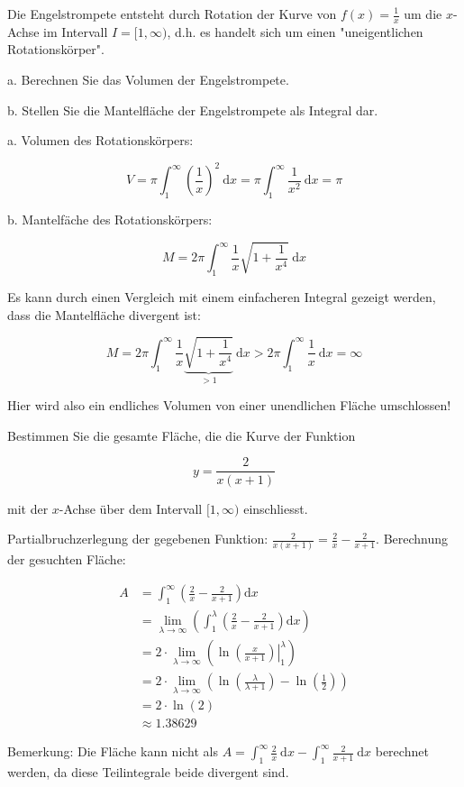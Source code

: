 \begin{example}
    Die Engelstrompete entsteht durch Rotation der Kurve von $f(x)=\frac{1}{x}$ um die $x$-Achse im Intervall $I=[1, \infty)$, d.h. es handelt sich um einen "uneigentlichen Rotationskörper".

a. Berechnen Sie das Volumen der Engelstrompete.

b. Stellen Sie die Mantelfläche der Engelstrompete als Integral dar.

\tcblower

a. Volumen des Rotationskörpers:

$$
V=\pi \int_{1}^{\infty}\left(\frac{1}{x}\right)^{2} \mathrm{~d} x=\pi \int_{1}^{\infty} \frac{1}{x^{2}} \mathrm{~d} x=\pi
$$

b. Mantelfäche des Rotationskörpers:

$$
M=2 \pi \int_{1}^{\infty} \frac{1}{x} \sqrt{1+\frac{1}{x^{4}}} \mathrm{~d} x
$$

Es kann durch einen Vergleich mit einem einfacheren Integral gezeigt werden, dass die Mantelfläche divergent ist:

$$
M=2 \pi \int_{1}^{\infty} \frac{1}{x} \underbrace{\sqrt{1+\frac{1}{x^{4}}}}_{>1} \mathrm{~d} x>2 \pi \int_{1}^{\infty} \frac{1}{x} \mathrm{~d} x=\infty
$$

Hier wird also ein endliches Volumen von einer unendlichen Fläche umschlossen!
\end{example}

\begin{example}
    Bestimmen Sie die gesamte Fläche, die die Kurve der Funktion

$$
y=\frac{2}{x(x+1)}
$$

mit der $x$-Achse über dem Intervall $[1, \infty)$ einschliesst.

\tcblower

Partialbruchzerlegung der gegebenen Funktion: $\frac{2}{x(x+1)}=\frac{2}{x}-\frac{2}{x+1}$. Berechnung der gesuchten Fläche:

$$
\begin{aligned}
A & =\int_{1}^{\infty}\left(\frac{2}{x}-\frac{2}{x+1}\right) \mathrm{d} x \\
& =\lim _{\lambda \rightarrow \infty}\left(\int_{1}^{\lambda}\left(\frac{2}{x}-\frac{2}{x+1}\right) \mathrm{d} x\right) \\
& =2 \cdot \lim _{\lambda \rightarrow \infty}\left(\left.\ln \left(\frac{x}{x+1}\right)\right|_{1} ^{\lambda}\right) \\
& =2 \cdot \lim _{\lambda \rightarrow \infty}\left(\ln \left(\frac{\lambda}{\lambda+1}\right)-\ln \left(\frac{1}{2}\right)\right) \\
& =2 \cdot \ln (2) \\
& \approx 1.38629
\end{aligned}
$$

Bemerkung: Die Fläche kann nicht als $A=\int_{1}^{\infty} \frac{2}{x} \mathrm{~d} x-\int_{1}^{\infty} \frac{2}{x+1} \mathrm{~d} x$ berechnet werden, da diese Teilintegrale beide divergent sind.

\end{example}



